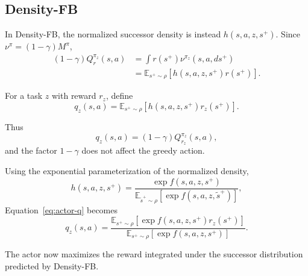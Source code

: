 \documentclass[11pt]{article}
\begin{document}
\subsection{Density-FB}

In Density-FB, the normalized successor density is instead $h(s,a,z,s^+)$.
Since $\nu^\pi=(1-\gamma)M^\pi$,
\begin{align}
    (1-\gamma)Q_r^{\pi_z}(s,a)  &= \int r(s^+) \nu^{\pi_z}(s,a,ds^+) \\
                                &= \mathbb E_{s^+\sim\rho} \left[ h(s,a,z,s^+) r(s^+) \right].
\end{align}

For a task $z$ with reward $r_z$, define
\begin{equation}
\boxed{
    q_z(s,a) = \mathbb E_{s^+\sim\rho} \left[ h(s,a,z,s^+)r_z(s^+) \right].
}
\label{eq:actor-q}
\end{equation}

Thus
\begin{equation}
    q_z(s,a) = (1-\gamma)Q_{r_z}^{\pi_z}(s,a),
\end{equation}
and the factor $1-\gamma$ does not affect the greedy action.

Using the exponential parameterization of the normalized density,
\begin{equation}
    h(s,a,z,s^+)    = \frac{ \exp f(s,a,z,s^+) }{ \mathbb E_{\tilde s^+\sim\rho} \left[\exp f(s,a,z,\tilde s^+)\right]},
\end{equation}
Equation~\eqref{eq:actor-q} becomes
\begin{equation}
\boxed{
    q_z(s,a) = \frac{\mathbb E_{s^+\sim\rho}\left[\exp f(s,a,z,s^+)r_z(s^+)\right]}{\mathbb E_{s^+\sim\rho}\left[\exp f(s,a,z,s^+)\right]}.
}
\label{eq:actor-q-density}
\end{equation}

The actor now maximizes the reward integrated under the successor distribution predicted by Density-FB.
\end{document}
